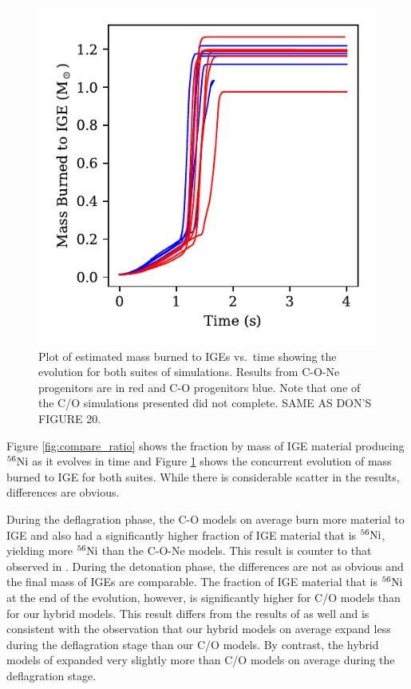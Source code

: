 \documentclass[iop,apj]{emulateapj}
\newcommand{\Ni}[1]{\ensuremath{{}^{#1}{\rm Ni}}}
\begin{document}
\begin{figure}
\includegraphics[width=\columnwidth]{figures/MBTI_v_time_plot.pdf}
\caption{\label{fig:compare_burned}
Plot of estimated mass burned to IGEs vs.\ time showing the evolution
for both suites of simulations. Results from C-O-Ne progenitors are
in red and C-O progenitors blue.
Note that one of the C/O simulations presented did not complete.
{\color{red} SAME AS DON'S FIGURE 20.}
}
\end{figure}

Figure \ref{fig:compare_ratio} shows the fraction by mass of IGE
material producing \Ni{56} as it evolves in time and Figure
\ref{fig:compare_burned} shows the concurrent evolution of mass
burned to IGE for both suites. While there is considerable
scatter in the results, differences are obvious.

During the deflagration phase, the C-O models
on average burn more material to IGE and also had a significantly higher
fraction of IGE material that is \Ni{56}, yielding more \Ni{56} than
the C-O-Ne models. This result is counter to that observed in
\citet{willcoxetal2016}. During the detonation phase, the differences
are not as obvious and the final mass of IGEs are comparable. The
fraction of IGE material that is \Ni{56} at the end of the evolution,
however, is significantly higher for C/O models than for our hybrid models.
{\color{blue}This result differs from the results of
  \citet{willcoxetal2016} as well and is consistent with the
  observation that our hybrid models on average expand less during the
  deflagration stage than our C/O models. By contrast, the hybrid models of
  \citet{willcoxetal2016} expanded very slightly more
  than C/O models on average during the deflagration stage.}
\end{document}

